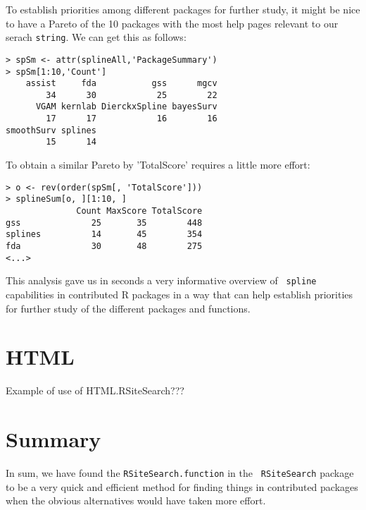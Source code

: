 To establish priorities among different packages for further study, it
might be nice to have a Pareto of the 10 packages with the most help
pages relevant to our serach {\tt string}.  We can get this as
follows:
\begin{verbatim}
> spSm <- attr(splineAll,'PackageSummary')
> spSm[1:10,'Count']
    assist     fda           gss      mgcv
        34      30            25        22
      VGAM kernlab DierckxSpline bayesSurv
        17      17            16        16
smoothSurv splines
        15      14
\end{verbatim}
To obtain a similar Pareto by 'TotalScore' requires a little more
effort:
\begin{verbatim}
> o <- rev(order(spSm[, 'TotalScore']))
> splineSum[o, ][1:10, ]
              Count MaxScore TotalScore
gss              25       35        448
splines          14       45        354
fda              30       48        275
<...>
\end{verbatim}
This analysis gave us in seconds a very informative overview of {\tt
spline} capabilities in contributed R packages in a way that can help
establish priorities for further study of the different packages and
functions.

\section*{HTML}


Example of use of HTML.RSiteSearch???




\section*{Summary}
In sum, we have found the {\tt RSiteSearch.function} in the {\tt
RSiteSearch} package to be a very quick and efficient method for
finding things in contributed packages when the obvious alternatives
would have taken more effort.

